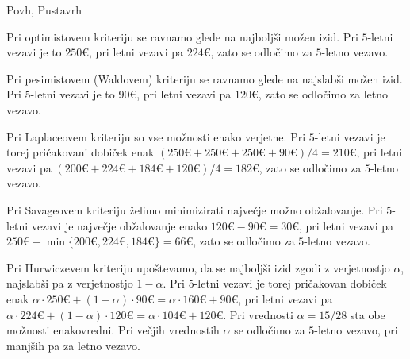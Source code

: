 \begin{naloga}{Povh, Pustavrh}{\cite[Naloga~6.9]{pp}}
\begin{odgovor}
Pri optimistovem kriteriju se ravnamo glede na najboljši možen izid.
Pri $5$-letni vezavi je to $250 €$, pri letni vezavi pa $224 €$,
zato se odločimo za $5$-letno vezavo.

Pri pesimistovem (Waldovem) kriteriju se ravnamo glede na najslabši možen izid.
Pri $5$-letni vezavi je to $90 €$, pri letni vezavi pa $120 €$,
zato se odločimo za letno vezavo.

Pri Laplaceovem kriteriju so vse možnosti enako verjetne.
Pri $5$-letni vezavi je torej pričakovani dobiček enak
$(250 € + 250 € + 250 € + 90 €)/4 = 210 €$,
pri letni vezavi pa $(200 € + 224 € + 184 € + 120 €)/4 = 182 €$,
zato se odločimo za $5$-letno vezavo.

Pri Savageovem kriteriju želimo minimizirati največje možno obžalovanje.
Pri $5$-letni vezavi je največje obžalovanje enako $120 € - 90 € = 30 €$,
pri letni vezavi pa $250 € - \min\{200€, 224€, 184€\} = 66 €$,
zato se odločimo za $5$-letno vezavo.

Pri Hurwiczevem kriteriju upoštevamo,
da se najboljši izid zgodi z ve\-rjet\-nost\-jo $\alpha$,
najslabši pa z verjetnostjo $1 - \alpha$.
Pri $5$-letni vezavi je torej pričakovan dobiček enak
$\alpha \cdot 250 € + (1 - \alpha) \cdot 90 € = \alpha \cdot 160 € + 90 €$,
pri letni vezavi pa
$\alpha \cdot 224 € + (1 - \alpha) \cdot 120 € = \alpha \cdot 104 € + 120 €$.
Pri vrednosti $\alpha = 15/28$ sta obe možnosti enakovredni.
Pri večjih vrednostih $\alpha$ se odločimo za $5$-letno vezavo,
pri manjših pa za letno vezavo.
\end{odgovor}
\end{naloga}
